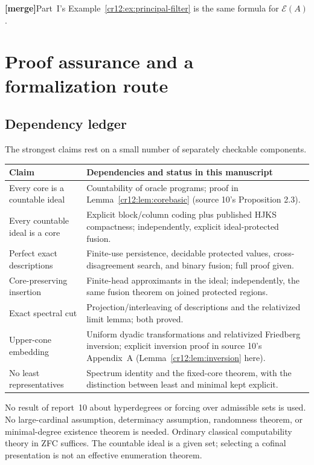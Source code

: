 \documentclass[11pt,letterpaper]{article}
\theoremstyle{plain}
\theoremstyle{definition}
\theoremstyle{remark}
\numberwithin{equation}{section}
\newcommand{\Ecode}{\mathcal E}
\newcommand{\mergenote}[1]{\par\smallskip\noindent
 {\small\textsf{\textbf{[merge]}}\enspace #1}\par\smallskip}
\begin{document}
\mergenote{Part~I's Example~\ref{cr12:ex:principal-filter} is the same formula for
$\Ecode(A)$.}

\section{Proof assurance and a formalization route}\label{cr12:lr:sec:assurance}
\subsection{Dependency ledger}
The strongest claims rest on a small number of separately checkable components.
\begin{center}
\small
\begin{tabularx}{\textwidth}{@{}p{}X@{}}
\toprule
Claim & Dependencies and status in this manuscript\\
\midrule
Every core is a countable ideal & Countability of oracle programs; proof in Lemma~\ref{cr12:lem:corebasic} (source 10's Proposition 2.3).\\[3pt]
Every countable ideal is a core & Explicit block/column coding plus published HJKS compactness; independently, explicit ideal-protected fusion.\\[3pt]
Perfect exact descriptions & Finite-use persistence, decidable protected values, cross-disagreement search, and binary fusion; full proof given.\\[3pt]
Core-preserving insertion & Finite-head approximants in the ideal; independently, the same fusion theorem on joined protected regions.\\[3pt]
Exact spectral cut & Projection/interleaving of descriptions and the relativized limit lemma; both proved.\\[3pt]
Upper-cone embedding & Uniform dyadic transformations and relativized Friedberg inversion; explicit inversion proof in source 10's Appendix~A (Lemma~\ref{cr12:lem:inversion} here).\\[3pt]
No least representatives & Spectrum identity and the fixed-core theorem, with the distinction between least and minimal kept explicit.\\
\bottomrule
\end{tabularx}
\end{center}
No result of report~10 about hyperdegrees or forcing over admissible sets is used. No
large-cardinal assumption, determinacy assumption, randomness theorem, or
minimal-degree existence theorem is needed. Ordinary classical computability theory in
ZFC suffices. The countable ideal is a given set; selecting a cofinal presentation is
not an effective enumeration theorem.
\end{document}
